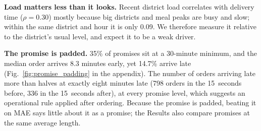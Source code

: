 \textbf{Load matters less than it looks.} Recent district load correlates with delivery time
($\rho = 0.30$) mostly because big districts and meal peaks are busy and slow; within the same district
and hour it is only 0.09. We therefore measure it relative to the district's usual level, and expect it
to be a weak driver.

\textbf{The promise is padded.} 35\% of promises sit at a 30-minute minimum, and the median order
arrives 8.3 minutes early, yet 14.7\% arrive late (Fig.~\ref{fig:promise_padding} in the appendix). The number of
orders arriving late more than halves at exactly eight minutes late (798 orders in the 15~seconds
before, 336 in the 15~seconds after), at every promise level, which suggests an operational rule
applied after ordering. Because the promise is padded, beating it on MAE says little about it as a
promise; the Results also compare promises at the same average length.
